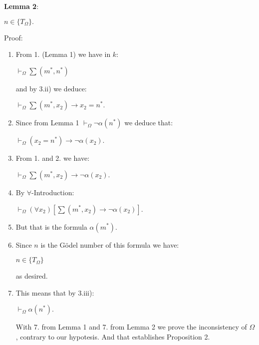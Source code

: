 \documentclass[12pt]{article}
\begin{document}
\textbf{Lemma 2}:

\begin{center}
$n \in \{ T_{\Omega} \}.$ 
\end{center}

Proof:

\begin{enumerate}
\item From 1. (Lemma 1) we have in $k$:

\begin{center}
$\vdash_{\Omega} \sum (m^*, n^*)$
\end{center}

and by 3.ii) we deduce:

\begin{center}
$\vdash_{\Omega} \sum (m^*, x_2) \to x_2 = n^*.$
\end{center}

\item Since from Lemma 1 $\vdash_{\Omega} \neg \alpha (n^*)$ we deduce that:

\begin{center}
$\vdash_{\Omega} (x_2 = n^*) \to \neg \alpha (x_2).$
\end{center}

\item From 1. and 2. we have:

\begin{center} 
$\vdash_{\Omega} \sum (m^*, x_2) \to \neg \alpha (x_2).$
\end{center}

\item By $\forall$-Introduction:

\begin{center}
$\vdash_{\Omega} (\forall x_2) [\sum (m^*, x_2) \to \neg \alpha (x_2)].$
\end{center}

\item But that is the formula $\alpha (m^*).$

\item Since $n$ is the G\"odel number of this formula we have:

\begin{center}
$n \in \{ T_{\Omega} \}$
\end{center}

as desired.

\item This means that by 3.iii):

\begin{center}
$\vdash_{\Omega} \alpha (n^*).$
\end{center}

With 7. from Lemma 1 and 7. from Lemma 2 we prove the inconsistency of $\Omega$, contrary to our hypotesis. And that establishes Proposition 2.
\end{enumerate}
\end{document}
